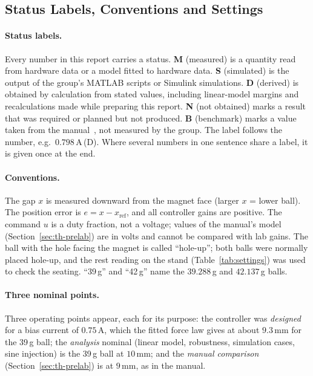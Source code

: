 \documentclass[11pt,a4paper]{article}
\newcommand{\st}[1]{\,\textup{(#1)}}
\begin{document}
\subsection{Status Labels, Conventions and Settings}
\label{sec:status}
\paragraph{Status labels.} Every number in this report carries a status. \textbf{M} (measured) is a quantity read from
hardware data or a model fitted to hardware data. \textbf{S} (simulated) is the output of the group's MATLAB scripts or
Simulink simulations. \textbf{D} (derived) is obtained by calculation from stated values, including linear-model margins
and recalculations made while preparing this report. \textbf{N} (not obtained) marks a result that was required or
planned but not produced. \textbf{B} (benchmark) marks a value taken from the manual~\cite{mlsmanual}, not measured by the
group. The label follows the number, e.g.\ $0.798$\,A\st{D}. Where several numbers in one sentence share a label, it is
given once at the end.

\paragraph{Conventions.} The gap $x$ is measured downward from the magnet face (larger $x$ = lower ball). The position
error is $e = x - x_{\mathrm{ref}}$, and all controller gains are positive. The command $u$ is a duty fraction, not a
voltage; values of the manual's model (Section~\ref{sec:th-prelab}) are in volts and cannot be compared with lab gains.
The ball with the hole facing the magnet is called ``hole-up''; both balls were normally placed hole-up, and the rest
reading on the stand (Table~\ref{tab:settings}) was used to check the seating. ``39\,g'' and ``42\,g'' name the
$39.288$\,g and $42.137$\,g balls.

\paragraph{Three nominal points.} Three operating points appear, each for its purpose: the controller was \emph{designed}
for a bias current of $0.75$\,A, which the fitted force law gives at about $9.3$\,mm for the 39\,g ball; the
\emph{analysis} nominal (linear model, robustness, simulation cases, sine injection) is the 39\,g ball at $10$\,mm; and the
\emph{manual comparison} (Section~\ref{sec:th-prelab}) is at $9$\,mm, as in the manual.
\end{document}
